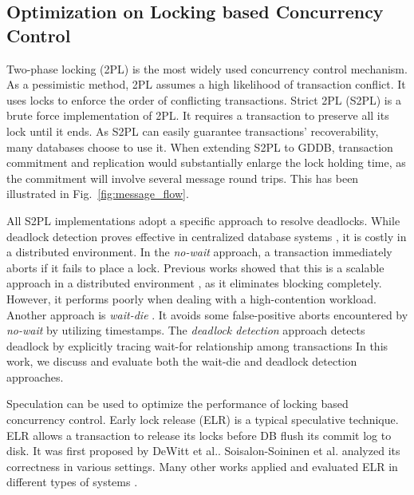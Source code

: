 \documentclass[conference]{IEEEtran}
\begin{document}
\subsection{Optimization on Locking based Concurrency Control}
Two-phase locking (2PL) is the most widely used concurrency control mechanism.
As a pessimistic method, 2PL assumes a high likelihood of transaction conflict.
It uses locks to enforce the order of conflicting transactions.
Strict 2PL (S2PL) is a brute force implementation of 2PL.
It requires a transaction to preserve all its lock until it ends.
As S2PL can easily guarantee transactions' recoverability, many databases choose to use it.
When extending S2PL to GDDB, transaction commitment and replication would substantially enlarge the lock holding time,
as the commitment will involve several message round trips. This has been illustrated in Fig.~\ref{fig:message_flow}.

All S2PL implementations adopt a specific approach to resolve deadlocks.
While deadlock detection proves effective in centralized database systems \cite{MySQL}\cite{PostgreSQL}, it is costly in a distributed environment.
In the \emph{no-wait}
\cite{EvaluationOfCC:journals/pvldb/HardingAPS17}
approach, a transaction immediately aborts if it fails to place a lock.
Previous works showed that this is a scalable approach in a distributed environment \cite{EvaluationCC1000Cores:journals/pvldb/YuBPDS14}\cite{EvaluationOfCC:journals/pvldb/HardingAPS17},
as it eliminates blocking completely.
However, it performs poorly when dealing with a high-contention workload.
Another approach is \emph{wait-die} \cite{LockNoWait:journals/csur/BernsteinG81}.
It avoids some false-positive aborts encountered by \emph{no-wait} by utilizing timestamps.
The \emph{deadlock detection} approach \cite{LockCC:conf/ds/GrayLPT76} detects deadlock by explicitly tracing wait-for relationship among transactions
In this work, we discuss and evaluate both the wait-die and deadlock detection approaches.


Speculation can be used to optimize the performance of locking based concurrency control.
Early lock release (ELR)
\cite{EfficientLocking:conf/vldb/KimuraGK12}
\cite{ELR:dewitt_implementation_1984}
\cite{PS2PL:conf/icdt/Soisalon-SoininenY95}
\cite{Aether:journals/pvldb/JohnsonPSAA10}
\cite{Actor-Oriented-DB:conf/icde/Bernstein18}
is a typical speculative technique.
ELR allows a transaction to release its locks before DB flush its commit log to disk.
It was first proposed by DeWitt et al.\cite{ELR:dewitt_implementation_1984}.
Soisalon-Soininen et al. \cite{PS2PL:conf/icdt/Soisalon-SoininenY95} analyzed its correctness in various settings.
Many other works applied and evaluated ELR in different types of systems
\cite{EfficientLocking:conf/vldb/KimuraGK12}
\cite{Aether:journals/pvldb/JohnsonPSAA10}.
\end{document}
